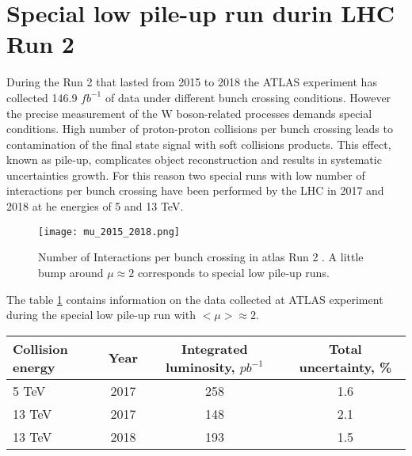         \section{Special low pile-up run durin LHC Run 2}
        During the Run 2 that lasted from 2015 to 2018 the ATLAS experiment has collected 146.9 $fb^{-1}$ of data under different bunch crossing conditions. However the precise measurement of the W boson-related processes demands special conditions. High number of proton-proton collisions per bunch crossing leads to contamination of the final state signal with soft collisions products. This effect, known as pile-up, complicates object reconstruction and results in systematic uncertainties growth. For this reason two special runs with low number of interactions per bunch crossing have been performed by the LHC in 2017 and 2018 at he energies of 5 and 13 TeV. \\
		 \begin{figure}[htpb]
			\texttt{[image: mu\_2015\_2018.png]}
			\caption{ Number of Interactions per bunch crossing in \gls{atlas} Run 2 \cite{run2lumi}. A little bump around $\mu \approx 2$ corresponds to special low pile-up runs.}
			\label{fig::run2lumi}
			\end{figure}
			The table \ref{tab::lowmu} contains information on the data collected at ATLAS experiment during the special low pile-up run with $<\mu> \approx 2$.\\
			\begin{table}
			\centering			
			\begin{tabular}{|l|c|c|c|}
			\hline
			\label{tab::lowmu}
			\textbf{Collision energy} & \textbf{Year}& \textbf{Integrated luminosity, $pb^{-1}$ }&  Total uncertainty, \%\\
			\hline
			5 TeV  & 2017 & 258& 1.6\\
			13 TeV  & 2017 & 148& 2.1 \\
			13 TeV  & 2018 & 193& 1.5\\
			\hline
			\end{tabular}
			\end{table}